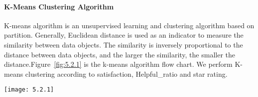 \documentclass[../mcmpaper]{subfiles}
\begin{document}
	\paragraph{K-Means Clustering Algorithm}
    K-means\cite{4} algorithm is an unsupervised learning and clustering algorithm based on partition. Generally, Euclidean distance is used as an indicator to measure the similarity between data objects. The similarity is inversely proportional to the distance between data objects, and the larger the similarity, the smaller the distance.Figure~\ref{fig:5.2.1} is the k-means algorithm flow chart. We perform K-means clustering according to satisfaction, Helpful\_ratio and star rating.\\[1em]
    \begin{minipage}{1.0\linewidth}
    \centering
    \texttt{[image: 5.2.1]}
    \label{fig:5.2.1}
    \end{minipage}
\end{document}
